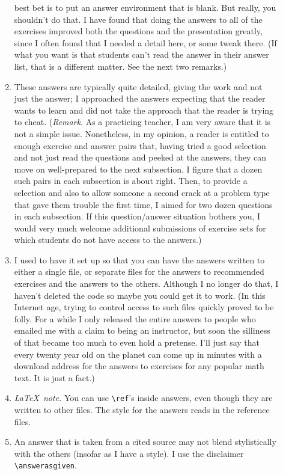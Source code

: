 \documentclass[titlepage]{article}
\newcommand{\latexnote}{\textit{\LaTeX\ note.} }
\begin{document}
\begin{description}
\begin{enumerate}
        best bet is to put an answer environment that is blank.
        But really, you shouldn't do that. 
        I have found that doing the answers to all of the exercises
        improved both the questions and the presentation greatly,
        since I often found that I needed a detail here, or
        some tweak there.  
        (If what you want is that students can't read the answer in their
        answer list, that is a different matter.
        See the next two remarks.)
      \item
         These answers are typically quite detailed, giving the work
         and not just the answer; I approached the answers 
         expecting that the reader wants to learn
         and did not take the
         approach that the reader is trying to cheat.
         (\textit{Remark}.
         As a practicing teacher, I am very aware that it is not a simple
         issue.
         Nonetheless, in my opinion, a reader is 
         entitled to enough exercise and answer pairs that,
         having tried a good selection and not just read the questions 
         and peeked at the answers,
         they can move on well-prepared to the next subsection.
         I figure that a dozen such pairs in each subsection is
         about right.
         Then, to provide a selection and also to allow someone 
         a second crack at a problem type that gave them trouble the 
         first time, I aimed for two dozen
         questions in each subsection.
         If this question/answer situation bothers you, 
         I would very much welcome additional submissions of 
         exercise sets for which students do not have access
         to the answers.)  
     \item 
         I used to have it set up so that 
         you can have the answers written to either 
         a single file,
         or separate files for the answers to recommended exercises and
         the answers to the others.
         Although I no longer do that, I haven't deleted the code so maybe 
         you could get it to work.
         (In this Internet age, trying to control access to such files
         quickly proved to be folly.
         For a while I only released the entire answers to people who emailed
         me with a claim to being an instructor, but soon the silliness of that
         became too much to even hold a pretense.
         I'll just say that every twenty year old
         on the planet can come up in minutes 
         with a download address for the answers to exercises for any
         popular math text.
         It is just a fact.)
      \item
         \latexnote
         You can use \verb|\ref|'s inside answers, even though they
         are written to other files.
         The style for the answers reads in the reference files.
      \item
         An answer that is taken from a cited source may not blend 
         stylistically with the others (insofar as I have a style).
         I use the disclaimer \verb|\answerasgiven|.
    \end{enumerate}



\end{description}
\end{document}
